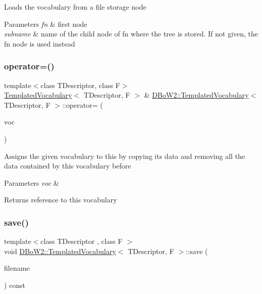 Loads the vocabulary from a file storage node 
\begin{DoxyParams}{Parameters}
{\em fn} & first node \\
\hline
{\em subname} & name of the child node of fn where the tree is stored. If not given, the fn node is used instead \\
\hline
\end{DoxyParams}
\mbox{\label{classDBoW2_1_1TemplatedVocabulary_a5355c25b6f37c11acffe48996e19323f}} 
\subsubsection{\texorpdfstring{operator=()}{operator=()}}
{\footnotesize\ttfamily template$<$class T\+Descriptor, class F$>$ \\
\hyperlink{classDBoW2_1_1TemplatedVocabulary}{Templated\+Vocabulary}$<$ T\+Descriptor, F $>$ \& \hyperlink{classDBoW2_1_1TemplatedVocabulary}{D\+Bo\+W2\+::\+Templated\+Vocabulary}$<$ T\+Descriptor, F $>$\+::operator= (\begin{DoxyParamCaption}\item[{const \hyperlink{classDBoW2_1_1TemplatedVocabulary}{Templated\+Vocabulary}$<$ T\+Descriptor, F $>$ \&}]{voc }\end{DoxyParamCaption})}

Assigns the given vocabulary to this by copying its data and removing all the data contained by this vocabulary before 
\begin{DoxyParams}{Parameters}
{\em voc} & \\
\hline
\end{DoxyParams}
\begin{DoxyReturn}{Returns}
reference to this vocabulary 
\end{DoxyReturn}
\mbox{\label{classDBoW2_1_1TemplatedVocabulary_a92ca49bd6600bddbad145fb6e0543fa1}} 
\subsubsection{\texorpdfstring{save()}{save()}\hspace{0.1cm}{\footnotesize\ttfamily [1/2]}}
{\footnotesize\ttfamily template$<$class T\+Descriptor , class F $>$ \\
void \hyperlink{classDBoW2_1_1TemplatedVocabulary}{D\+Bo\+W2\+::\+Templated\+Vocabulary}$<$ T\+Descriptor, F $>$\+::save (\begin{DoxyParamCaption}\item[{const std\+::string \&}]{filename }\end{DoxyParamCaption}) const}

